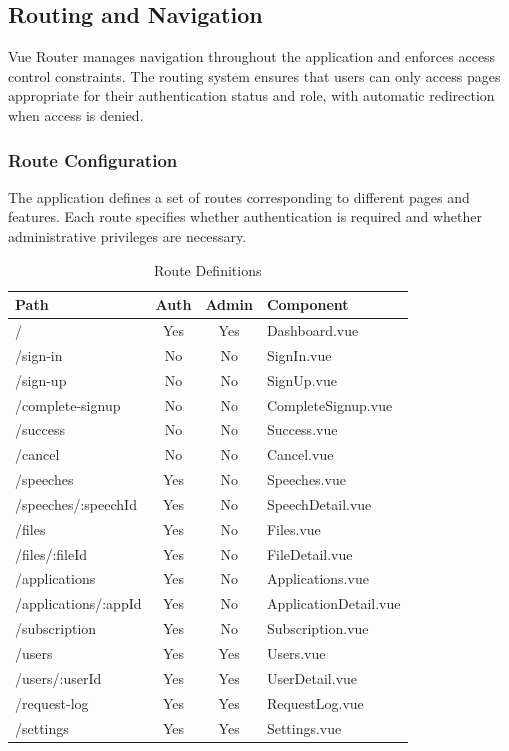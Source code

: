\subsection{Routing and Navigation}
\label{sec:frontend_routing}

Vue Router manages navigation throughout the application and enforces access control constraints. The routing system ensures that users can only access pages appropriate for their authentication status and role, with automatic redirection when access is denied.

\subsubsection{Route Configuration}

The application defines a set of routes corresponding to different pages and features. Each route specifies whether authentication is required and whether administrative privileges are necessary.

\begin{table}[H]
\centering
\begin{tabular}{|l|c|c|l|}
\hline
\textbf{Path} & \textbf{Auth} & \textbf{Admin} & \textbf{Component} \\
\hline
/ & Yes & Yes & Dashboard.vue \\
\hline
/sign-in & No & No & SignIn.vue \\
\hline
/sign-up & No & No & SignUp.vue \\
\hline
/complete-signup & No & No & CompleteSignup.vue \\
\hline
/success & No & No & Success.vue \\
\hline
/cancel & No & No & Cancel.vue \\
\hline
/speeches & Yes & No & Speeches.vue \\
\hline
/speeches/:speechId & Yes & No & SpeechDetail.vue \\
\hline
/files & Yes & No & Files.vue \\
\hline
/files/:fileId & Yes & No & FileDetail.vue \\
\hline
/applications & Yes & No & Applications.vue \\
\hline
/applications/:appId & Yes & No & ApplicationDetail.vue \\
\hline
/subscription & Yes & No & Subscription.vue \\
\hline
/users & Yes & Yes & Users.vue \\
\hline
/users/:userId & Yes & Yes & UserDetail.vue \\
\hline
/request-log & Yes & Yes & RequestLog.vue \\
\hline
/settings & Yes & Yes & Settings.vue \\
\hline
\end{tabular}
\caption{Route Definitions}
\label{tab:route_definitions}
\end{table}

